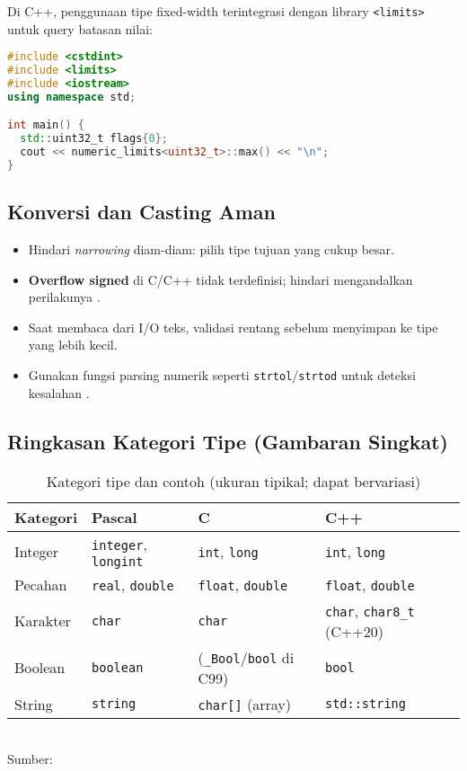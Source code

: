 \documentclass[../main.tex]{subfiles}
\begin{document}
Di C++, penggunaan tipe fixed-width terintegrasi dengan library \texttt{<limits>} untuk query batasan nilai:

\begin{lstlisting}[language=C++, caption={Contoh penggunaan <cstdint> di C++}]
#include <cstdint>
#include <limits>
#include <iostream>
using namespace std;

int main() {
  std::uint32_t flags{0};
  cout << numeric_limits<uint32_t>::max() << "\n";
}
\end{lstlisting}

\subsection{Konversi dan Casting Aman}
\begin{itemize}
  \item Hindari \textit{narrowing} diam-diam: pilih tipe tujuan yang cukup besar.
  \item \textbf{Overflow signed} di C/C++ tidak terdefinisi; hindari mengandalkan perilakunya \parencite{iso-c-draft-n1570,cpp-reference}.
  \item Saat membaca dari I/O teks, validasi rentang sebelum menyimpan ke tipe yang lebih kecil.
  \item Gunakan fungsi parsing numerik seperti \texttt{strtol}/\texttt{strtod} untuk deteksi kesalahan \parencite{c-strtol}.
\end{itemize}

\subsection{Ringkasan Kategori Tipe (Gambaran Singkat)}
\begin{table}[H]
  \centering
  \caption{Kategori tipe dan contoh (ukuran tipikal; dapat bervariasi)}
  \begin{tabular}{@{}llll@{}}
    \toprule
    Kategori & Pascal & C & C++ \\
    \midrule
    Integer & \texttt{integer}, \texttt{longint} & \texttt{int}, \texttt{long} & \texttt{int}, \texttt{long} \\
    Pecahan & \texttt{real}, \texttt{double} & \texttt{float}, \texttt{double} & \texttt{float}, \texttt{double} \\
    Karakter & \texttt{char} & \texttt{char} & \texttt{char}, \texttt{char8\_t} (C++20) \\
    Boolean & \texttt{boolean} & (\texttt{\_Bool}/\texttt{bool} di C99) & \texttt{bool} \\
    String & \texttt{string} & \texttt{char[]} (array) & \texttt{std::string} \\
    \bottomrule
  \end{tabular}
  \\Sumber: \parencite{free-pascal-docs,iso-c-draft-n1570,cpp-fundamental-types}
\end{table}
\end{document}
